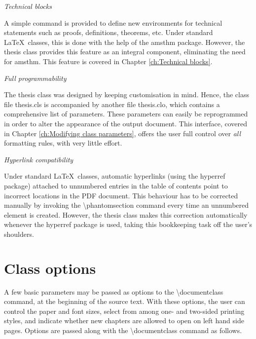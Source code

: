 \documentclass[twoside,openany]{thesis}
\begin{document}
\begin{listing}
\item   {\itshape Technical blocks}

        A simple command is provided to define new environments for technical statements such as proofs, definitions, theorems, etc.
        Under standard \LaTeX\ classes, this is done with the help of the {\ttfamily amsthm} package.
        However, the {\ttfamily thesis} class provides this feature as an integral component, eliminating the need for {\ttfamily amsthm}.
        This feature is covered in Chapter \ref{ch:Technical blocks}.

\item   {\itshape Full programmability}

        The {\ttfamily thesis} class was designed by keeping customisation in mind.
        Hence, the class file {\ttfamily thesis.cls} is accompanied by another file {\ttfamily thesis.clo}, which contains a comprehensive list of parameters.
        These parameters can easily be reprogrammed in order to alter the appearance of the output document.
        This interface, covered in Chapter \ref{ch:Modifying class parameters}, offers the user full control over {\itshape all} formatting rules, with very little effort.

\item   {\itshape Hyperlink compatibility}

        Under standard \LaTeX\ classes, automatic hyperlinks (using the {\ttfamily hyperref} package) attached to unnumbered entries in the table of contents point to incorrect locations in the PDF document.
        This behaviour has to be corrected manually by invoking the {\ttfamily\textbackslash phantomsection} command every time an unnumbered element is created.
        However, the {\ttfamily thesis} class makes this correction automatically whenever the {\ttfamily hyperref} package is used, taking this bookkeeping task off the user's shoulders.

\end{listing}

\chapter{Class options}\label{ch:Class options}

A few basic parameters may be passed as options to the {\ttfamily\textbackslash documentclass} command, at the beginning of the source text.
With these options, the user can control the paper and font sizes, select from among one- and two-sided printing styles, and indicate whether new chapters are allowed to open on left hand side pages.
Options are passed along with the {\ttfamily\textbackslash documentclass} command as follows.
\end{document}
